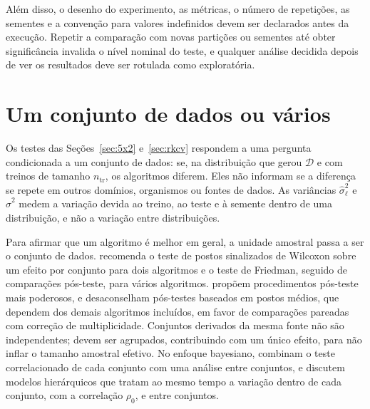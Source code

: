 \documentclass[11pt,a4paper]{article}
\newcommand{\tr}{\mathrm{tr}}
\begin{document}
Além disso, o desenho do experimento, as métricas, o número de repetições, as
sementes e a convenção para valores indefinidos devem ser declarados antes da
execução. Repetir a comparação com novas partições ou sementes até obter
significância invalida o nível nominal do teste, e qualquer análise decidida
depois de ver os resultados deve ser rotulada como exploratória.

\section{Um conjunto de dados ou vários}\label{sec:multiplos}

Os testes das Seções~\ref{sec:5x2} e~\ref{sec:rkcv} respondem a uma pergunta
condicionada a um conjunto de dados: se, na distribuição que gerou
$\mathcal{D}$ e com treinos de tamanho $n_{\tr}$, os algoritmos diferem. Eles
não informam se a diferença se repete em outros domínios, organismos ou
fontes de dados. As variâncias $\hat\sigma_\ell^2$ e $\hat\sigma^2$ medem a variação devida
ao treino, ao teste e à semente dentro de uma distribuição, e não a variação
entre distribuições.

Para afirmar que um algoritmo é melhor em geral, a unidade amostral passa a
ser o conjunto de dados. \citet{demsar2006statistical} recomenda o teste de
postos sinalizados de Wilcoxon sobre um efeito por conjunto para dois
algoritmos e o teste de Friedman, seguido de comparações pós-teste, para vários
algoritmos. \citet{garcia2008extension} propõem procedimentos pós-teste mais
poderosos, e \citet{benavoli2016posthoc} desaconselham pós-testes baseados em
postos médios, que dependem dos demais algoritmos incluídos, em favor de
comparações pareadas com correção de multiplicidade. Conjuntos derivados da
mesma fonte não são independentes; devem ser agrupados, contribuindo com um
único efeito, para não inflar o tamanho amostral efetivo. No enfoque
bayesiano, \citet{corani2015bayesian} combinam o teste correlacionado de cada
conjunto com uma análise entre conjuntos, e \citet{benavoli2017timeforchange}
discutem modelos hierárquicos que tratam ao mesmo tempo a variação dentro de
cada conjunto, com a correlação $\rho_0$, e entre conjuntos.
\end{document}

